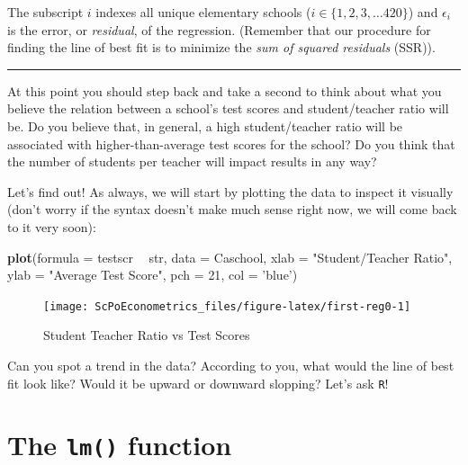 \documentclass[]{book}
\newenvironment{Shaded}{\begin{snugshade}}{\end{snugshade}}
\newcommand{\KeywordTok}[1]{\textcolor[rgb]{0.13,0.29,0.53}{\textbf{#1}}}
\newcommand{\DataTypeTok}[1]{\textcolor[rgb]{0.13,0.29,0.53}{#1}}
\newcommand{\DecValTok}[1]{\textcolor[rgb]{0.00,0.00,0.81}{#1}}
\newcommand{\StringTok}[1]{\textcolor[rgb]{0.31,0.60,0.02}{#1}}
\newcommand{\OperatorTok}[1]{\textcolor[rgb]{0.81,0.36,0.00}{\textbf{#1}}}
\newcommand{\NormalTok}[1]{#1}
\theoremstyle{definition}
\theoremstyle{definition}
\theoremstyle{definition}
\theoremstyle{remark}
\begin{document}
The subscript \(i\) indexes all unique elementary schools
(\(i \in \{1, 2, 3, \dots 420\}\)) and \(\epsilon_i\) is the error, or
\emph{residual}, of the regression. (Remember that our procedure for
finding the line of best fit is to minimize the \emph{sum of squared
residuals} (SSR)).

\begin{center}\rule{0.5\linewidth}{\linethickness}\end{center}

At this point you should step back and take a second to think about what
you believe the relation between a school's test scores and
student/teacher ratio will be. Do you believe that, in general, a high
student/teacher ratio will be associated with higher-than-average test
scores for the school? Do you think that the number of students per
teacher will impact results in any way?

Let's find out! As always, we will start by plotting the data to inspect
it visually (don't worry if the syntax doesn't make much sense right
now, we will come back to it very soon):

\begin{Shaded}
\begin{Highlighting}[]
\KeywordTok{plot}\NormalTok{(}\DataTypeTok{formula =}\NormalTok{ testscr }\OperatorTok{~}\StringTok{ }\NormalTok{str,}
     \DataTypeTok{data =}\NormalTok{ Caschool,}
     \DataTypeTok{xlab =} \StringTok{"Student/Teacher Ratio"}\NormalTok{,}
     \DataTypeTok{ylab =} \StringTok{"Average Test Score"}\NormalTok{, }\DataTypeTok{pch =} \DecValTok{21}\NormalTok{, }\DataTypeTok{col =} \StringTok{'blue'}\NormalTok{)}
\end{Highlighting}
\end{Shaded}

\begin{figure}

{\centering \texttt{[image: ScPoEconometrics\_files/figure-latex/first-reg0-1]} 

}

\caption{Student Teacher Ratio vs Test Scores}\label{fig:first-reg0}
\end{figure}

Can you spot a trend in the data? According to you, what would the line
of best fit look like? Would it be upward or downward slopping? Let's
ask \texttt{R}!

\section{\texorpdfstring{The \texttt{lm()}
function}{The lm() function}}\label{the-lm-function}
\end{document}
